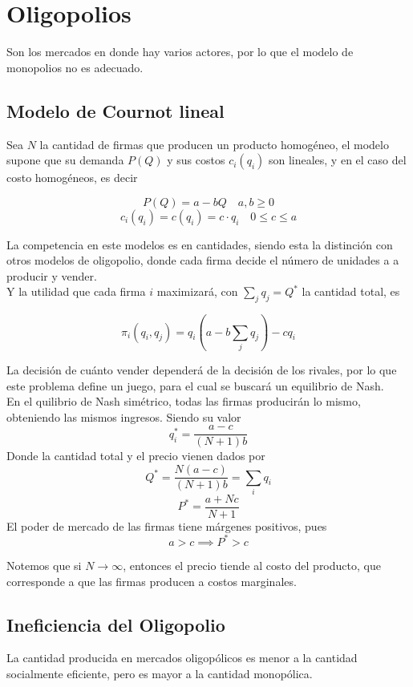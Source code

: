 \section{Oligopolios}

Son los mercados en donde hay varios actores, por lo que el modelo de monopolios no es adecuado. 

\subsection{Modelo de Cournot lineal}
Sea $N$ la cantidad de firmas que producen un producto homogéneo, el modelo supone que su demanda $P(Q)$ y sus costos $c_i(q_i)$ son lineales, y en el caso del costo homogéneos, es decir

\[P(Q) = a-bQ \quad a,b\geq 0\]
\[c_i(q_i) = c(q_i) = c\cdot q_i \quad 0 \leq c \leq a\]

La competencia en este modelos es en cantidades, siendo esta la distinción con otros modelos de oligopolio, donde cada firma decide el número de unidades a a producir y vender.\\

Y la utilidad que cada firma $i$ maximizará, con $\sum_jq_j=Q^*$ la cantidad total, es

\[\pi_i(q_i,q_j)=q_i(a-b\sum_jq_j)-cq_i\]

La decisión de cuánto vender dependerá de la decisión de los rivales, por lo que este problema define un juego, para el cual se buscará un equilibrio de Nash.\\

En el quilibrio de Nash simétrico, todas las firmas producirán lo mismo, obteniendo las mismos ingresos. Siendo su valor
\[q_i^* = \frac{a-c}{(N+1)b}\]
Donde la cantidad total y el precio vienen dados por
\[Q^* = \frac{N(a-c)}{(N+1)b} = \sum_iq_i\]
\[P^* = \frac{a + Nc}{N+1}\]
El poder de mercado de las firmas tiene márgenes positivos, pues \[a > c \implies P^* > c\]

Notemos que si $N \longrightarrow \infty$, entonces el precio tiende al costo del producto, que corresponde a que las firmas producen a costos marginales. 

\subsection{Ineficiencia del Oligopolio}
La cantidad producida en mercados oligopólicos es menor a la cantidad socialmente eficiente, pero es mayor a la cantidad monopólica.\\

